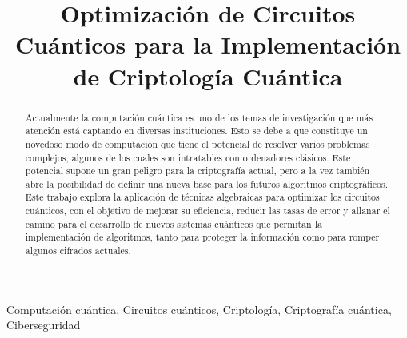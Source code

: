 \documentclass[10pt,conference,a4paper]{IEEEtran}
\begin{document}
\title{Optimización de Circuitos Cuánticos para la Implementación de Criptología Cuántica}

\author{
\and
{}
\and
{}
\and
{}
}


\maketitle


\begin{abstract}
  Actualmente la computación cuántica es uno de los temas de investigación que más atención está captando en diversas  instituciones. Esto se debe a que constituye un novedoso modo de computación que tiene el potencial de resolver varios problemas complejos, algunos de los cuales son intratables con ordenadores clásicos. Este potencial supone un gran peligro para la criptografía actual, pero a la vez también abre la posibilidad de definir una nueva base para los futuros algoritmos criptográficos. Este trabajo explora la aplicación de técnicas algebraicas para optimizar los circuitos cuánticos, con el objetivo de mejorar su eficiencia, reducir las tasas de error y allanar el camino para el desarrollo de nuevos sistemas cuánticos que permitan la implementación de algoritmos, tanto para proteger la información como para romper algunos cifrados actuales.
\end{abstract}


\begin{IEEEkeywords}
Computación cuántica, Circuitos cuánticos, Criptología, Criptografía cuántica, Ciberseguridad
\end{IEEEkeywords}
\end{document}
